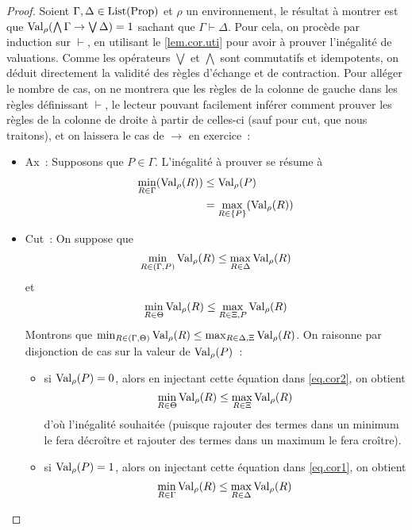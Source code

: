 \begin{proof}
  Soient $\Gamma,\Delta\in\operatorname{List}(\operatorname{Prop})$ et $\rho$ un environnement, le résultat
  à montrer est que $\operatorname{Val}_\rho(\bigwedge\Gamma\to\bigvee\Delta) = 1$ sachant que
  $\Gamma\vdash \Delta$. Pour cela, on procède par induction sur $\vdash$, en
  utilisant le \cref{lem.cor.uti} pour avoir à prouver l'inégalité de
  valuations. Comme les opérateurs $\bigvee$ et $\bigwedge$ sont commutatifs et
  idempotents, on déduit directement la validité des règles d'échange et de
  contraction. Pour alléger le nombre de cas, on ne montrera que les règles de
  la colonne de gauche dans les règles définissant $\vdash$, le lecteur pouvant
  facilement inférer comment prouver les règles de la colonne de droite à partir
  de celles-ci (sauf pour cut, que nous traitons), et on laissera le cas de
  $\to$ en exercice~:
  \begin{itemize}
  \item Ax~: Supposons que $P\in\Gamma$. L'inégalité à prouver se résume à
    \begin{align*}
      \min_{R \in \Gamma}(\operatorname{Val}_\rho(R)) &\leq \operatorname{Val}_\rho(P) \\
      &= \max_{R \in \{P\}}(\operatorname{Val}_\rho(R))
    \end{align*}
  \item Cut~: On suppose que
    \begin{equation}\label{eq.cor1}
      \min_{R \in (\Gamma, P)} \operatorname{Val}_\rho(R) \leq \max_{R \in \Delta} \operatorname{Val}_\rho(R)
    \end{equation}
    et
    \begin{equation}\label{eq.cor2}
      \min_{R \in \Theta} \operatorname{Val}_\rho(R) \leq \max_{R \in \Xi, P} \operatorname{Val}_\rho(R)
    \end{equation}
    Montrons que
    $\min_{R \in (\Gamma, \Theta)} \operatorname{Val}_\rho(R)
    \leq \max_{R \in \Delta,\Xi} \operatorname{Val}_\rho(R)$.
    On raisonne par disjonction de cas sur la valeur de $\operatorname{Val}_\rho(P)$~:
    \begin{itemize}
    \item si $\operatorname{Val}_\rho(P) = 0$, alors en injectant cette équation dans
      \ref{eq.cor2}, on obtient
      \[\min_{R \in\Theta} \operatorname{Val}_\rho(R) \leq \max_{R\in \Xi}\operatorname{Val}_\rho(R)\]
      d'où l'inégalité souhaitée (puisque rajouter des termes dans un minimum
      le fera décroître et rajouter des termes dans un maximum le fera croître).
    \item si $\operatorname{Val}_\rho(P) = 1$, alors on injectant cette équation dans
      \ref{eq.cor1}, on obtient
      \[\min_{R\in \Gamma} \operatorname{Val}_\rho(R) \leq \max_{R\in \Delta} \operatorname{Val}_\rho(R)\]

\end{itemize}
\end{itemize}
\end{proof}

